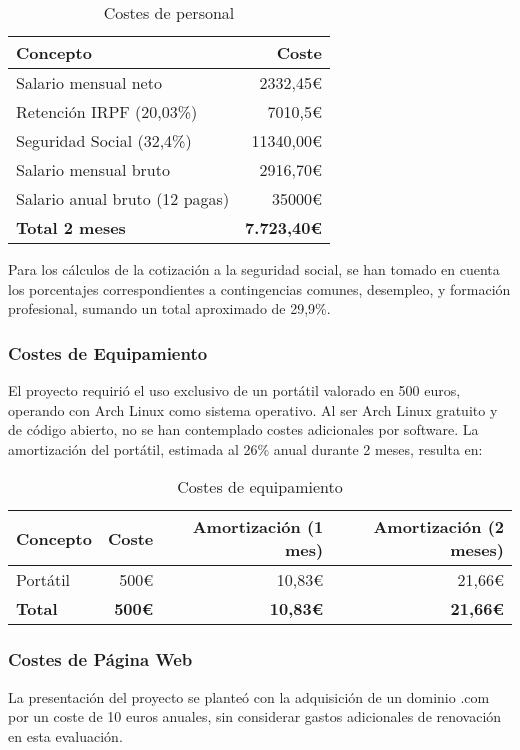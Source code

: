 \begin{table}[h]
\centering
\begin{tabular}{| l | r |}
\hline
Concepto & Coste \\ \hline
Salario mensual neto & 2332,45€ \\
Retención IRPF (20,03\%) & 7010,5€ \\
Seguridad Social (32,4\%) & 11340,00€ \\
Salario mensual bruto & 2916,70€ \\
Salario anual bruto (12 pagas) & 35000€ \\ \hline
\textbf{Total 2 meses} & \textbf{7.723,40€} \\ \hline
\end{tabular}
\caption{Costes de personal}
\end{table}

Para los cálculos de la cotización a la seguridad social, se han tomado en cuenta los porcentajes correspondientes a contingencias comunes, desempleo, y formación profesional, sumando un total aproximado de 29,9\%\cite{seg-social}.

\subsubsection{Costes de Equipamiento}
El proyecto requirió el uso exclusivo de un portátil valorado en 500 euros, operando con Arch Linux como sistema operativo. Al ser Arch Linux gratuito y de código abierto, no se han contemplado costes adicionales por software. La amortización del portátil, estimada al 26\% anual durante 2 meses, resulta en:

\begin{table}[h]
\centering
\begin{tabular}{| l | r | r | r |}
\hline
Concepto & Coste & Amortización (1 mes) & Amortización (2 meses) \\ \hline
Portátil & 500€ & 10,83€ & 21,66€ \\ \hline
\textbf{Total} & \textbf{500€} & \textbf{10,83€} & \textbf{21,66€} \\ \hline
\end{tabular}
\caption{Costes de equipamiento}
\end{table}

\subsubsection{Costes de Página Web}
La presentación del proyecto se planteó con la adquisición de un dominio .com por un coste de 10 euros anuales, sin considerar gastos adicionales de renovación en esta evaluación.

